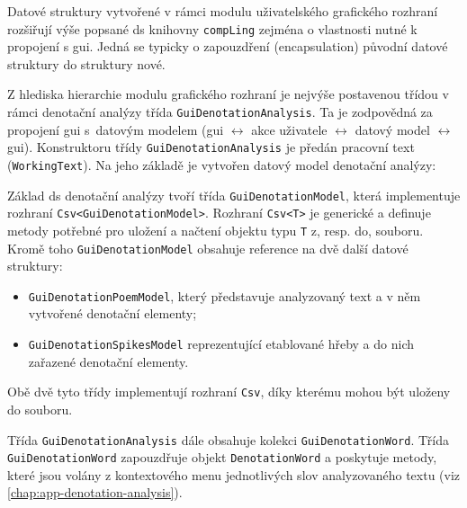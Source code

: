 \documentclass[dp.tex]{subfiles}
\begin{document}
Datové struktury vytvořené v rámci modulu uživatelského grafického rozhraní rozšiřují výše popsané \acrshort{ds} knihovny \texttt{compLing} zejména o vlastnosti nutné k propojení s \acrshort{gui}. Jedná se typicky o zapouzdření (encapsulation) původní datové struktury do struktury nové.

Z hlediska hierarchie modulu grafického rozhraní je nejvýše postavenou třídou v rámci denotační analýzy třída \texttt{GuiDenotationAnalysis}. Ta je zodpovědná za propojení \acrshort{gui} s~datovým modelem (\acrshort{gui} $\leftrightarrow$ akce uživatele $\leftrightarrow$ datový model $\leftrightarrow$ \acrshort{gui}). Konstruktoru třídy \texttt{GuiDenotationAnalysis} je předán pracovní text (\texttt{WorkingText}). Na jeho základě je vytvořen datový model denotační analýzy:

Základ \acrshort{ds} denotační analýzy tvoří třída \texttt{GuiDenotationModel}, která implementuje  rozhraní \texttt{Csv<GuiDenotationModel>}. Rozhraní \texttt{Csv<T>} je generické a definuje metody potřebné pro uložení a načtení objektu typu \texttt{T} z, resp. do, souboru. Kromě toho \texttt{GuiDenotationModel} obsahuje reference na dvě další datové struktury: 
\begin{itemize}
\item \texttt{GuiDenotationPoemModel}, který představuje analyzovaný text a v něm vytvořené denotační elementy;
\item \texttt{GuiDenotationSpikesModel} reprezentující etablované hřeby a do nich zařazené denotační elementy.
\end{itemize}

Obě dvě tyto třídy implementují rozhraní \texttt{Csv}, díky kterému mohou být uloženy do souboru.

Třída \texttt{GuiDenotationAnalysis} dále obsahuje kolekci \texttt{GuiDenotationWord}. Třída \texttt{GuiDenotationWord} zapouzdřuje objekt \texttt{DenotationWord} a poskytuje metody, které jsou volány z kontextového menu jednotlivých slov analyzovaného textu (viz \ref{chap:app-denotation-analysis}).
\end{document}
